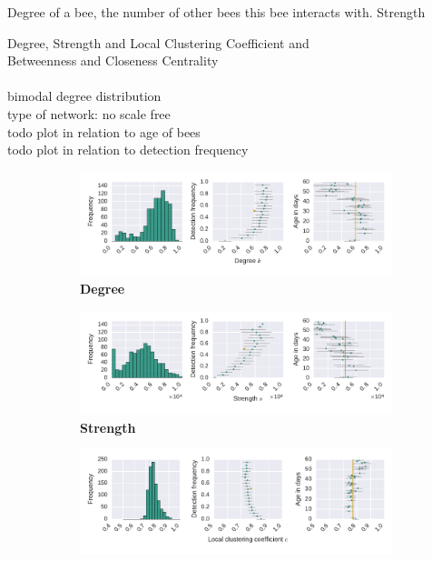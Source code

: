 

Degree of a bee, the number of other bees this bee interacts with.
Strength


Degree, Strength and Local Clustering Coefficient and \\
Betweenness and Closeness Centrality\\
\\
bimodal degree distribution\\
type of network: no scale free\\
todo plot in relation to age of bees\\
todo plot in relation to detection frequency\\

\begin{figure}[!htb]
	\centering
	\begin{subfigure}[b]{1.0\textwidth}
	\centering
	\includegraphics[width=1.0\textwidth]{Figures/n3-stat-degreeAgeDetF.pdf}
	\caption[Degree]{\textbf{Degree}}
	\label{fig:n3-degree}
	\end{subfigure}
	\begin{subfigure}[b]{1.0\textwidth}
	\centering
	\includegraphics[width=1.0\textwidth]{Figures/n3-stat-strengthAgeDetF.pdf}
	\caption[Strength]{\textbf{Strength}}
	\label{fig:n3-strength}
	\end{subfigure}
	\begin{subfigure}[b]{1.0\textwidth}
	\centering
	\includegraphics[width=1.0\textwidth]{Figures/n3-stat-lccAgeDetF.pdf}

\end{subfigure}
\end{figure}
